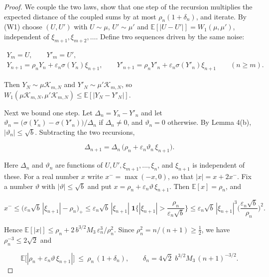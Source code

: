 \documentclass[aip,jmp,preprint,onecolumn,floatfix,superscriptaddress,nofootinbib,11pt]{revtex4-2}
\theoremstyle{plain}
\theoremstyle{remark}
\numberwithin{equation}{section}
\newcommand{\E}{\mathbb{E}}
\newcommand{\eps}{\varepsilon}
\begin{document}
\begin{proof} We couple the two laws, show that one step of the recursion multiplies the expected distance of the coupled sums by at most $\rho_n(1+\delta_n)$, and iterate. By (W1) choose $(U,U')$ with $U\sim\mu$, $U'\sim\mu'$ and $\E[|U-U'|]=W_1(\mu,\mu')$, independent of $\xi_{m+1},\xi_{m+2},\dots$. Define two sequences driven by the same noise:

\begin{equation*}
\begin{gathered} Y_m=U,\qquad Y'_m=U',\\[2pt] Y_{n+1}=\rho_nY_n+\eps_n\sigma(Y_n)\xi_{n+1},\qquad Y'_{n+1}=\rho_nY'_n+\eps_n\sigma(Y'_n)\xi_{n+1}\qquad(n\ge m). \end{gathered}
\end{equation*}

Then $Y_N\sim\mu \mathcal K_{m,N}$ and $Y'_N\sim\mu' \mathcal K_{m,N}$, so $W_1(\mu \mathcal K_{m,N},\mu' \mathcal K_{m,N})\le\E[|Y_N-Y'_N|]$.

Next we bound one step. Let $\Delta_n=Y_n-Y'_n$ and let $\vartheta_n=\big(\sigma(Y_n)-\sigma(Y'_n)\big)/\Delta_n$ if $\Delta_n\ne0$, and $\vartheta_n=0$ otherwise. By Lemma 4(b), $|\vartheta_n|\le\sqrt b$. Subtracting the two recursions,

\begin{equation*}
\Delta_{n+1}=\Delta_n\,\big(\rho_n+\eps_n\vartheta_n\,\xi_{n+1}\big).
\end{equation*}

Here $\Delta_n$ and $\vartheta_n$ are functions of $U,U',\xi_{m+1},\dots,\xi_n$, and $\xi_{n+1}$ is independent of these. For a real number $x$ write $x^-=\max(-x,0)$, so that $|x|=x+2x^-$. Fix a number $\vartheta$ with $|\vartheta|\le\sqrt b$ and put $x=\rho_n+\eps_n\vartheta\,\xi_{n+1}$. Then $\E[x]=\rho_n$, and

\begin{equation*}
x^-\le\big(\eps_n\sqrt b\,|\xi_{n+1}|-\rho_n\big)_+\le\eps_n\sqrt b\,|\xi_{n+1}|\;\mathbf 1\Big\{|\xi_{n+1}|>\frac{\rho_n}{\eps_n\sqrt b}\Big\}\le\eps_n\sqrt b\,|\xi_{n+1}|^{3}\Big(\frac{\eps_n\sqrt b}{\rho_n}\Big)^{2}.
\end{equation*}

Hence $\E[|x|]\le\rho_n+2\,b^{3/2}M_3\,\eps_n^{3}/\rho_n^{2}$. Since $\rho_n^{2}=n/(n+1)\ge\tfrac12$, we have $\rho_n^{-3}\le2\sqrt2$ and

\begin{equation*}
\E\big[|\rho_n+\eps_n\vartheta\,\xi_{n+1}|\big]\ \le\ \rho_n\,(1+\delta_n),\qquad \delta_n=4\sqrt2\;b^{3/2}M_3\,(n+1)^{-3/2}.
\end{equation*}


\end{proof}
\end{document}
